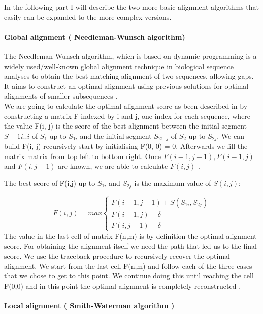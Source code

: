 \documentclass[11pt,a4paper]{report}
\begin{document}
In the following part I will describe the two more basic alignment algorithms that easily can be expanded to the more complex versions.

\paragraph{ Global alignment ( Needleman-Wunsch algorithm) }

The Needleman-Wunsch algorithm, which is based on dynamic programming is a widely used/well-known global alignment technique in biological sequence analyses to obtain the best-matching alignment of two sequences, allowing  gaps.\\
It aims to construct an optimal alignment using previous solutions for
optimal alignments of smaller subsequences \cite{durbin}.\\
We are going to calculate the optimal alignment score as been described in\cite{durbin} by constructing a matrix F indexed
by i and j, one index for each sequence, where the value F(i, j) is the score
of the best alignment between the initial segment $S-{1i..i}$ of $S_{1}$ up to $S_{1i}$ and the initial segment $S_{21..j}$ of $S_{2}$  up to $S_{2j}$. We can build F(i, j) recursively start by initialising F(0, 0) = 0. Afterwards we fill the matrix matrix from top left to bottom right. 
Once $ F(i-1, j-1 ), F(i-1 , j) $ and $ F(i , j-1) $ are known, we are able to calculate $ F(i, j)$ \cite{durbin}.

The best score of F(i,j) up to $S_{1i}$ and $S_{2j}$ is the maximum value of $S(i,j)$:

\[ F(i,j)= max
\begin{cases}
   F(i-1,j-1) + S(S_{1i} , S_{2j})\\
   F(i-1 , j)- \delta\\
   F(i,j-1)- \delta
\end{cases}
\]
The value in the last cell of matrix F(n,m) is by definition the optimal alignment score. 
For obtaining the alignment itself we need the path that led us to the final score. We use the traceback procedure to recursively recover the optimal alignment\cite{durbin}\cite{eddydynamic}.
We start from the last cell F(n,m) and follow each of the three cases that we chose to get to this point. We continue doing this until reaching the cell F(0,0) and in this point the optimal alignment is completely reconstructed \cite{eddydynamic}.



\paragraph{ Local alignment ( Smith-Waterman algorithm ) }
\end{document}
